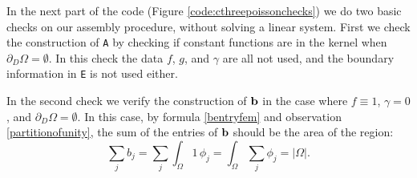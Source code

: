 In the next part of the code (Figure \ref{code:cthreepoissonchecks}) we do two basic checks on our assembly procedure, without solving a linear system.  First we check the construction of \texttt{A} by checking if constant functions are in the kernel when $\partial_D\Omega=\emptyset$.  In this check the data $f$, $g$, and $\gamma$ are all not used, and the boundary information in \texttt{E} is not used either.


In the second check we verify the construction of $\mathbf{b}$ in the case where $f\equiv 1$, $\gamma=0$, and $\partial_D\Omega=\emptyset$.  In this case, by formula \eqref{bentryfem} and observation \eqref{partitionofunity}, the sum of the entries of $\mathbf{b}$ should be the area of the region:
   $$\sum_j b_j = \sum_j \int_\Omega 1\, \phi_j = \int_\Omega \sum_j \phi_j = |\Omega|.$$





